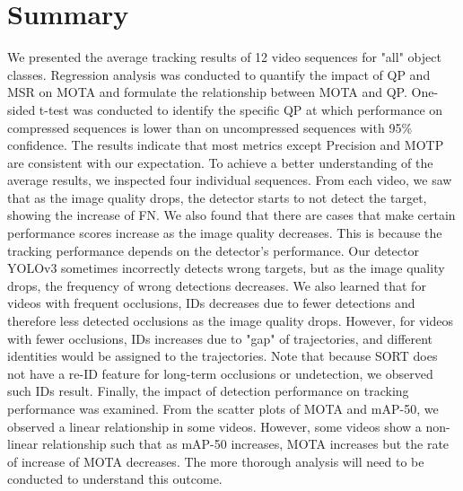 \section{Summary}
\label{sec:results/summary}

We presented the average tracking results of 12 video sequences for "all" object classes. Regression analysis was conducted to quantify the impact of QP and MSR on MOTA and formulate the relationship between MOTA and QP. One-sided t-test was conducted to identify the specific QP at which performance on compressed sequences is lower than on uncompressed sequences with 95\% confidence. The results indicate that most metrics except Precision and MOTP are consistent with our expectation. To achieve a better understanding of the average results, we inspected four individual sequences. From each video, we saw that as the image quality drops, the detector starts to not detect the target, showing the increase of FN. We also found that there are cases that make certain performance scores increase as the image quality decreases. This is because the tracking performance depends on the detector's performance. Our detector YOLOv3 sometimes incorrectly detects wrong targets, but as the image quality drops, the frequency of wrong detections decreases. We also learned that for videos with frequent occlusions, IDs decreases due to fewer detections and therefore less detected occlusions as the image quality drops. However, for videos with fewer occlusions, IDs increases due to "gap" of trajectories, and different identities would be assigned to the trajectories. Note that because SORT does not have a re-ID feature for long-term occlusions or undetection, we observed such IDs result. Finally, the impact of detection performance on tracking performance was examined. From the scatter plots of MOTA and mAP-50, we observed a linear relationship in some videos. However, some videos show a non-linear relationship such that as mAP-50 increases, MOTA increases but the rate of increase of MOTA decreases. The more thorough analysis will need to be conducted to understand this outcome.